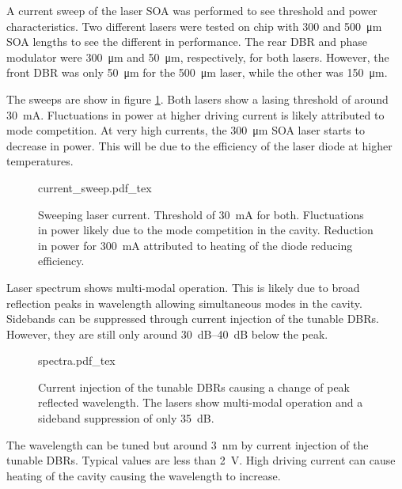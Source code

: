 A current sweep of the laser \ac{SOA} was performed to see threshold and power characteristics. Two different lasers were tested on chip with \num{300} and \SI{500}{\um} \ac{SOA} lengths to see the different in performance. The rear \ac{DBR} and phase modulator were \SI{300}{\um} and \SI{50}{\um}, respectively, for both lasers. However, the front \ac{DBR} was only \SI{50}{\um} for the \SI{500}{\um} laser, while the other was \SI{150}{\um}.

The sweeps are show in figure \ref{fig:hhi_soa_sweep}. Both lasers show a lasing threshold of around \SI{30}{\mA}. Fluctuations in power at higher driving current is likely attributed to mode competition. At very high currents, the \SI{300}{\um} \ac{SOA} laser starts to decrease in power. This will be due to the efficiency of the laser diode at higher temperatures.

\begin{figure}[tp]
	\centering
	\small	
	\def\svgwidth{0.9\textwidth} 
	{current_sweep.pdf_tex}
	\caption[Current sweep of HHI laser SOA]{Sweeping laser current. Threshold of \SI{30}{\mA} for both. Fluctuations in power likely due to the mode competition in the cavity. Reduction in power for \SI{300}{mA} attributed to heating of the diode reducing efficiency.}
	\label{fig:hhi_soa_sweep}
\end{figure}

Laser spectrum shows multi-modal operation. This is likely due to broad reflection peaks in wavelength allowing simultaneous modes in the cavity. Sidebands can be suppressed through current injection of the tunable \acp{DBR}. However, they are still only around \SIrange{30}{40}{dB} below the peak. 

\begin{figure}[tp]
	\centering
	\small	
	\def\svgwidth{0.9\textwidth} 
	{spectra.pdf_tex}
	\caption[Wavelength sweep through current injection of tunable DBRs]{Current injection of the tunable \acp{DBR} causing a change of peak reflected wavelength. The lasers show multi-modal operation and a sideband suppression of only \SI{35}{dB}.}
	\label{fig:hhi_dbr_sweep}
\end{figure}

The wavelength can be tuned but around \SI{3}{nm} by current injection of the tunable \acp{DBR}. Typical values are less than \SI{2}{V}. High driving current can cause heating of the cavity causing the wavelength to increase. 

